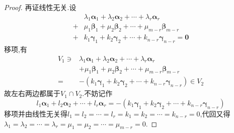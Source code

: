 {\begin{proof}
        再证线性无关.设
        \begin{align*}
              & \lambda_1\bm{\alpha}_1+\lambda_2\bm{\alpha}_2+\cdots+\lambda_r
            \bm{\alpha}_r
            \\
            + & \mu_1\bm{\beta}_1+\mu_2
            \bm{\beta}_2+\cdots+\mu_{m-r}
            \bm{\beta}_{m-r}                                                   \\
            + & k_1
            \bm{\gamma}_1+k_2
            \bm{\gamma}_2+\cdots+k_{n-r}\bm{\gamma}_{n-r}
            =\bm{0}
        \end{align*}
        移项,有
        \begin{align*}
            V_1\ni & \lambda_1\bm{\alpha}_1+\lambda_2\bm{\alpha}_2+\cdots+\lambda_r
            \bm{\alpha}_r
            \\
                   & +\mu_1\bm{\beta}_1+\mu_2
            \bm{\beta}_2+\cdots+\mu_{m-r}
            \bm{\beta}_{m-r}                                                        \\
            =      & -\left(k_1
            \bm{\gamma}_1+k_2
            \bm{\gamma}_2+\cdots+k_{n-r}\bm{\gamma}_{n-r}
            \right)\in V_2
        \end{align*}
        故左右两边都属于$V_1\cap V_2.$不妨记作
        \[
            l_1\bm{\alpha}_1+l_2\bm{\alpha}_2+\cdots+l_r\bm{\alpha}_r
            =-\left(k_1
            \bm{\gamma}_1+k_2
            \bm{\gamma}_2+\cdots+k_{n-r}\bm{\gamma}_{n-r}
            \right)
        \]
        移项并由线性无关得$l_1=l_2=\cdots=l_r=k_1=k_2=\cdots=k_{n-r}=0$,代回又得$\lambda_1=\lambda_2=\cdots=\lambda_r=\mu_1=\mu_2=\cdots=\mu_{m-r}=0$.
    \end{proof}
}
